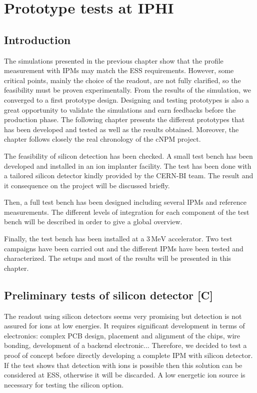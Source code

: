 \chapter{Prototype tests at IPHI}
\cleardoublepage

\minitoc

\section{Introduction}
\begin{refsection}
  \label{ch4:Introduction [C]}
  The simulations presented in the previous chapter show that the profile measurement with IPMs may match the ESS requirements. However, some critical points, mainly the choice of the readout, are not fully clarified, so the feasibility must be proven experimentally. From the results of the simulation, we converged to a first prototype design. Designing and testing prototypes is also a great opportunity to validate the simulations and earn feedbacks before the production phase. The following chapter presents the different prototypes that has been developed and tested as well as the results obtained. Moreover, the chapter follows closely the real chronology of the cNPM project.

  The feasibility of silicon detection has been checked. A small test bench has been developed and installed in an ion implanter facility. The test has been done with a tailored silicon detector kindly provided by the CERN-BI team. The result and it consequence on the project will be discussed briefly.

  Then, a full test bench has been designed including several IPMs and reference measurements. The different levels of integration for each component of the test bench will be described in order to give a global overview.

  Finally, the test bench has been installed at a $3\,\mathrm{MeV}$ accelerator. Two test campaigns have been carried out and the different IPMs have been tested and characterized. The setups and most of the results will be presented in this chapter.

  \section{Preliminary tests of silicon detector [C]}
  The readout using silicon detectors seems very promising but detection is not assured for ions at low energies. It requires significant development in terms of electronics: complex PCB design, placement and alignment of the chips, wire bonding, development of a backend electronic... Therefore, we decided to test a proof of concept before directly developing a complete IPM with silicon detector. If the test shows that detection with ions is possible then this solution can be considered at ESS, otherwise it will be discarded. A low energetic ion source is necessary for testing the silicon option.


\end{refsection}
